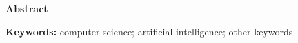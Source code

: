 \begin{center}
    \sanhao \bfseries
    \fangsong
    Abstract
\end{center}

\lipsum[20]

\noindent \textbf{Keywords:} computer science; artificial intelligence; other keywords